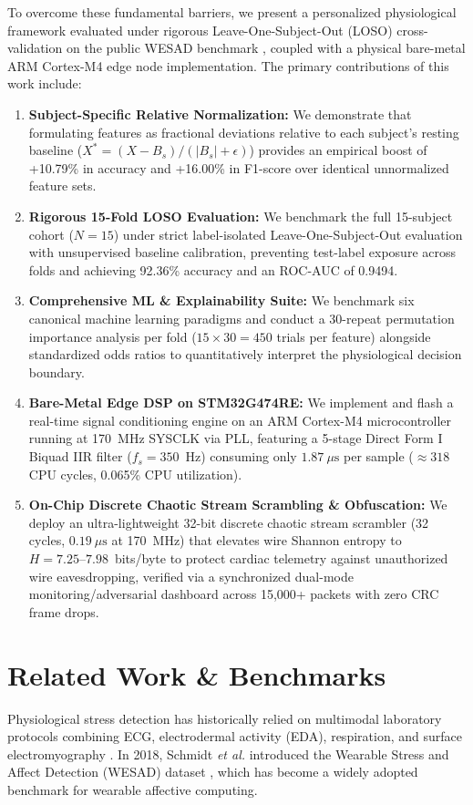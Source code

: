 \documentclass[conference]{IEEEtran}
\begin{document}
To overcome these fundamental barriers, we present a personalized physiological framework evaluated under rigorous Leave-One-Subject-Out (LOSO) cross-validation on the public WESAD benchmark \cite{schmidt2018wesad}, coupled with a physical bare-metal ARM Cortex-M4 edge node implementation. The primary contributions of this work include:
\begin{enumerate}
    \item \textbf{Subject-Specific Relative Normalization:} We demonstrate that formulating features as fractional deviations relative to each subject's resting baseline ($X^* = (X - B_s) / (|B_s| + \epsilon)$) provides an empirical boost of +10.79\% in accuracy and +16.00\% in F1-score over identical unnormalized feature sets.
    \item \textbf{Rigorous 15-Fold LOSO Evaluation:} We benchmark the full 15-subject cohort ($N=15$) under strict label-isolated Leave-One-Subject-Out evaluation with unsupervised baseline calibration, preventing test-label exposure across folds and achieving 92.36\% accuracy and an ROC-AUC of 0.9494.
    \item \textbf{Comprehensive ML \& Explainability Suite:} We benchmark six canonical machine learning paradigms and conduct a 30-repeat permutation importance analysis per fold ($15 \times 30 = 450$ trials per feature) alongside standardized odds ratios to quantitatively interpret the physiological decision boundary.
    \item \textbf{Bare-Metal Edge DSP on STM32G474RE:} We implement and flash a real-time signal conditioning engine on an ARM Cortex-M4 microcontroller running at 170~MHz SYSCLK via PLL, featuring a 5-stage Direct Form I Biquad IIR filter ($f_s = 350$~Hz) consuming only $1.87~\mu\text{s}$ per sample ($\approx 318$ CPU cycles, 0.065\% CPU utilization).
    \item \textbf{On-Chip Discrete Chaotic Stream Scrambling \& Obfuscation:} We deploy an ultra-lightweight 32-bit discrete chaotic stream scrambler (32 cycles, $0.19~\mu\text{s}$ at 170~MHz) that elevates wire Shannon entropy to $H = 7.25\text{--}7.98$~bits/byte to protect cardiac telemetry against unauthorized wire eavesdropping, verified via a synchronized dual-mode monitoring/adversarial dashboard across 15,000+ packets with zero CRC frame drops.
\end{enumerate}

\section{Related Work \& Benchmarks}
Physiological stress detection has historically relied on multimodal laboratory protocols combining ECG, electrodermal activity (EDA), respiration, and surface electromyography \cite{healey2005detecting, plarre2011continuous, sugita2015mental}. In 2018, Schmidt \textit{et al.} introduced the Wearable Stress and Affect Detection (WESAD) dataset \cite{schmidt2018wesad}, which has become a widely adopted benchmark for wearable affective computing.
\end{document}
